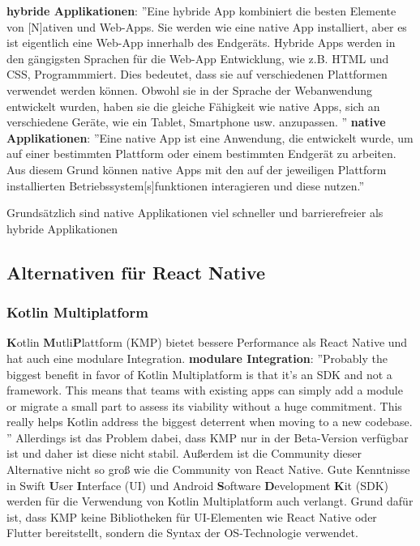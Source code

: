 \textbf{hybride Applikationen}: ''Eine hybride App kombiniert die besten Elemente von [N]ativen und Web-Apps.
Sie werden wie eine native App installiert, aber es ist eigentlich
eine Web-App innerhalb des Endgeräts.
Hybride Apps werden in den gängigsten Sprachen für die Web-App Entwicklung, wie z.B. HTML und CSS, Programmmiert. Dies bedeutet, dass sie auf verschiedenen Plattformen verwendet werden können.
Obwohl sie in der Sprache der Webanwendung entwickelt wurden, haben sie die gleiche Fähigkeit wie native Apps, sich an verschiedene Geräte, wie ein Tablet, Smartphone usw. anzupassen.
''\cite{native-vs-hybrid}
\newline
\textbf{native Applikationen}: ''Eine native App ist eine Anwendung, die entwickelt wurde,
um auf einer bestimmten Plattform oder einem bestimmten Endgerät zu arbeiten.
Aus diesem Grund können native Apps mit den auf der jeweiligen Plattform
installierten Betriebssystem[s]funktionen interagieren und diese nutzen.''

\cite{native-vs-hybrid}



Grundsätzlich sind native Applikationen  viel schneller und barrierefreier als hybride Applikationen
\cite{native-vs-hybrid}



\subsection{Alternativen für React Native}

\subsubsection{Kotlin Multiplatform}
\textbf{K}otlin \textbf{M}utli\textbf{P}lattform (KMP) bietet bessere Performance als React Native und hat auch eine modulare Integration.
\newline
\textbf{modulare Integration}: ''Probably the biggest benefit in favor of Kotlin Multiplatform is that it’s
an SDK and not a framework. This means that teams with existing apps can
simply add a module or migrate a small part to assess its viability without
a huge commitment. This really helps Kotlin address the biggest deterrent
when moving to a new codebase.
''
\cite{kotlin-multiplatform-vs-react-native}
Allerdings ist das Problem dabei, dass KMP nur in der Beta-Version verfügbar ist und daher ist diese nicht stabil.
Außerdem  ist die Community dieser Alternative nicht so groß wie die Community von React Native.
Gute Kenntnisse in Swift \textbf{U}ser \textbf{I}nterface (UI) und Android \textbf{S}oftware \textbf{D}evelopment \textbf{K}it (SDK) werden für die Verwendung von Kotlin Multiplatform auch verlangt.
Grund dafür ist, dass KMP keine Bibliotheken für UI-Elementen wie React Native oder Flutter bereitstellt, sondern die Syntax der OS-Technologie verwendet.
\cite{kotlin-multiplatform-vs-react-native}
